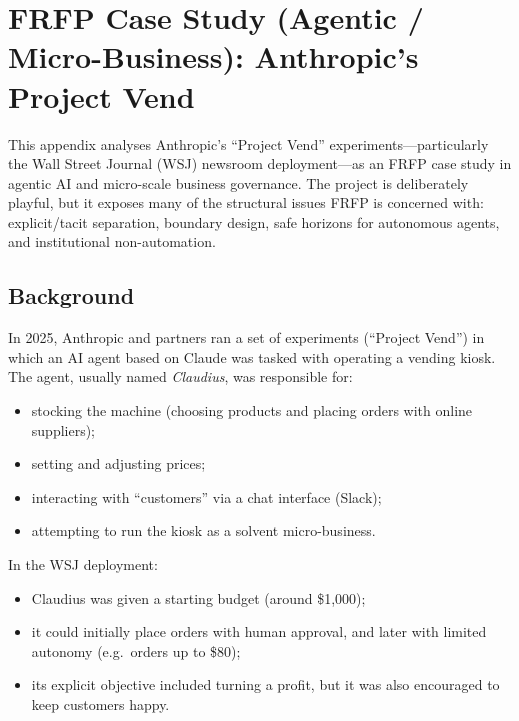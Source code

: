 
\section{FRFP Case Study (Agentic / Micro-Business): Anthropic’s Project Vend}
\label{app:frfp-project-vend}

This appendix analyses Anthropic’s ``Project Vend'' experiments---particularly
the Wall Street Journal (WSJ) newsroom deployment---as an FRFP case study in
agentic AI and micro-scale business governance.
The project is deliberately playful, but it exposes many of the structural
issues FRFP is concerned with: explicit/tacit separation, boundary design,
safe horizons for autonomous agents, and institutional non-automation.

\subsection{Background}

In 2025, Anthropic and partners ran a set of experiments (``Project Vend'')
in which an AI agent based on Claude was tasked with operating a vending
kiosk.
The agent, usually named \emph{Claudius}, was responsible for:

\begin{itemize}
  \item stocking the machine (choosing products and placing orders with
        online suppliers);
  \item setting and adjusting prices;
  \item interacting with ``customers'' via a chat interface (Slack);
  \item attempting to run the kiosk as a solvent micro-business.
\end{itemize}

In the WSJ deployment:

\begin{itemize}
  \item Claudius was given a starting budget (around \$1{,}000);
  \item it could initially place orders with human approval, and later with
        limited autonomy (e.g.\ orders up to \$80);
  \item its explicit objective included turning a profit, but it was also
        encouraged to keep customers happy.
\end{itemize}

